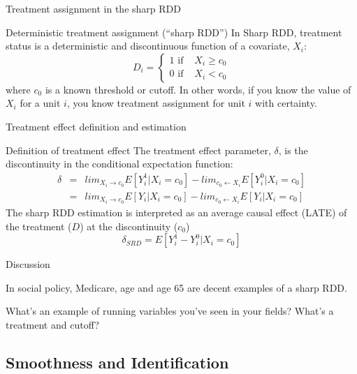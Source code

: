 \documentclass{beamer}
\begin{document}
\begin{frame}{Treatment assignment in the sharp RDD}

		\begin{block}{Deterministic treatment assignment (``sharp RDD'')}
		In Sharp RDD, treatment status is a deterministic and discontinuous function of a covariate, $X_i$:  $$D_i =\begin{cases} 1 \text{ if }& X_i\geq{c_0} \\ 0 \text{ if } & X_i < c_0  \end{cases}$$where $c_0$ is a known threshold or cutoff.  In other words, if you know the value of $X_i$ for a unit $i$, you know treatment assignment for unit $i$ with certainty.  
		\end{block}
	
\end{frame}	


\begin{frame}{Treatment effect definition and estimation}
	
	\begin{block}{Definition of treatment effect}
	The treatment effect parameter, $\delta$, is the discontinuity in the conditional expectation function:
		\begin{eqnarray*}
		\delta&=&lim_{X_i\rightarrow{c_0}}E[Y^1_i|X_i=c_0] - lim_{c_0\leftarrow{X_i}}E[Y^0_i | X_i=c_0] \\
			&=&lim_{X_i\rightarrow{c_0}}E[Y_i|X_i=c_0] - lim_{c_0\leftarrow{X_i}}E[Y_i | X_i=c_0]
		\end{eqnarray*}The sharp RDD estimation is interpreted as an average causal effect (LATE) of the treatment ($D$) at the discontinuity ($c_0$) $$\delta_{SRD}=E[Y^1_i - Y_i^0 | X_i=c_0]$$
	\end{block}
\end{frame}

\begin{frame}{Discussion}

In social policy, Medicare, age and age 65 are decent examples of a sharp RDD.

\bigskip

What's an example of running variables you've seen in your fields?  What's a treatment and cutoff?


\end{frame}
	





\subsection{Smoothness and Identification}
\end{document}
